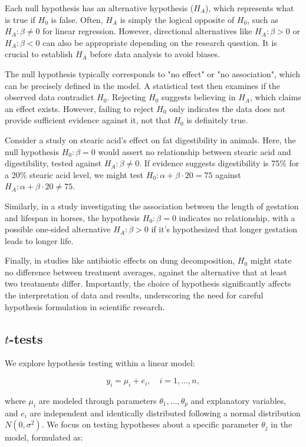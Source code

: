 \documentclass{article}
\begin{document}
Each null hypothesis has an alternative hypothesis ($H_A$), which represents what is true if $H_0$ is false. Often, $H_A$ is simply the logical opposite of $H_0$, such as $H_A: \beta \neq 0$ for linear regression. However, directional alternatives like $H_A: \beta > 0$ or $H_A: \beta < 0$ can also be appropriate depending on the research question. It is crucial to establish $H_A$ before data analysis to avoid biases.

The null hypothesis typically corresponds to "no effect" or "no association", which can be precisely defined in the model. A statistical test then examines if the observed data contradict $H_0$. Rejecting $H_0$ suggests believing in $H_A$, which claims an effect exists. However, failing to reject $H_0$ only indicates the data does not provide sufficient evidence against it, not that $H_0$ is definitely true.

Consider a study on stearic acid's effect on fat digestibility in animals. Here, the null hypothesis $H_0: \beta = 0$ would assert no relationship between stearic acid and digestibility, tested against $H_A: \beta \neq 0$. If evidence suggests digestibility is 75\% for a 20\% stearic acid level, we might test $H_0: \alpha + \beta \cdot 20 = 75$ against $H_A: \alpha + \beta \cdot 20 \neq 75$.

Similarly, in a study investigating the association between the length of gestation and lifespan in horses, the hypothesis $H_0: \beta = 0$ indicates no relationship, with a possible one-sided alternative $H_A: \beta > 0$ if it's hypothesized that longer gestation leads to longer life.

Finally, in studies like antibiotic effects on dung decomposition, $H_0$ might state no difference between treatment averages, against the alternative that at least two treatments differ. Importantly, the choice of hypothesis significantly affects the interpretation of data and results, underscoring the need for careful hypothesis formulation in scientific research.

\subsection{$t$-tests}

We explore hypothesis testing within a linear model:

\[
y_{i} = \mu_{i} + e_{i}, \quad i = 1, \ldots, n,
\]

where $\mu_{i}$ are modeled through parameters $\theta_{1}, \ldots, \theta_{p}$ and explanatory variables, and $e_{i}$ are independent and identically distributed following a normal distribution $N(0, \sigma^2)$. We focus on testing hypotheses about a specific parameter $\theta_j$ in the model, formulated as:
\end{document}
